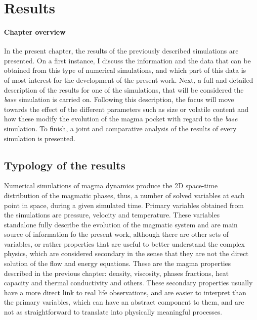 \chapter{Results}





\subsubsection{Chapter overview}
In the present chapter, the results of the previously described simulations are presented. On a first instance, I discuss the information and the data that can be obtained from this type of numerical simulations, and which part of this data is of most interest for the development of the present work. Next, a full and detailed description of the results for one of the simulations, that will be considered the \textit{base} simulation is carried on. Following this description, the focus will move towards the effect of the different parameters such as size or volatile content and how these modify the evolution of the magma pocket with regard to the \textit{base} simulation. To finish, a joint and comparative analysis of the results of every simulation is presented.

\section{Typology of the results}
Numerical simulations of magma dynamics produce the 2D space-time distribution of the magmatic phases, thus, a number of solved variables at each point in space, during a given simulated time. Primary variables obtained from the simulations are pressure, velocity and temperature. These variables standalone fully describe the evolution of the magmatic system and are main source of information fo the present work, although there are other sets of variables, or rather properties that are useful to better understand the complex physics, which are considered secondary in the sense that they are not the direct solution of the flow and energy equations. These are the magma properties described in the previous chapter: density, viscosity, phases fractions, heat capacity and thermal conductivity and others. These secondary properties usually have a more direct link to real life observations, and are easier to interpret than the primary variables, which can have an abstract component to them, and are not as straightforward to translate into physically meaningful processes.

